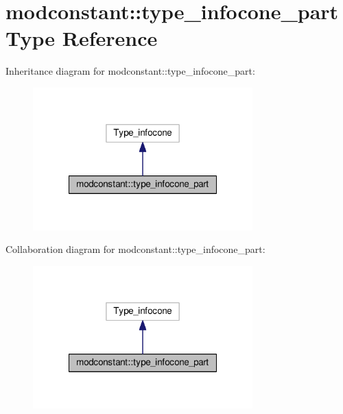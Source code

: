\hypertarget{structmodconstant_1_1type__infocone__part}{\section{modconstant\-:\-:type\-\_\-infocone\-\_\-part Type Reference}
\label{structmodconstant_1_1type__infocone__part}
}


Inheritance diagram for modconstant\-:\-:type\-\_\-infocone\-\_\-part\-:\nopagebreak
\begin{figure}[H]
\begin{center}
\leavevmode
\includegraphics[width=240pt]{structmodconstant_1_1type__infocone__part__inherit__graph}
\end{center}
\end{figure}


Collaboration diagram for modconstant\-:\-:type\-\_\-infocone\-\_\-part\-:\nopagebreak
\begin{figure}[H]
\begin{center}
\leavevmode
\includegraphics[width=240pt]{structmodconstant_1_1type__infocone__part__coll__graph}
\end{center}
\end{figure}
